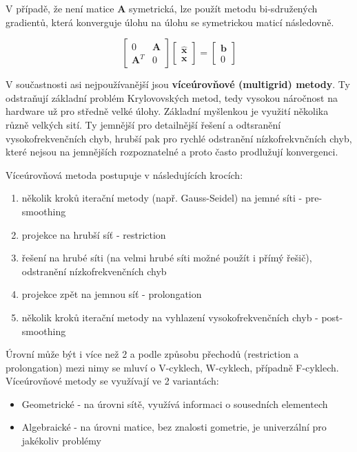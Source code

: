 \documentclass[a4paper,12pt]{report}
\theoremstyle{remark}
\begin{document}
V případě, že není matice $\boldsymbol{A}$ symetrická, lze použít metodu bi-sdružených gradientů, která konverguje úlohu na úlohu se symetrickou maticí následovně.

\begin{equation}
	\begin{bmatrix}
		0 & \boldsymbol{A}\\
		\boldsymbol{A}^T & 0
	\end{bmatrix}
	\begin{bmatrix}
		\hat{\boldsymbol{x}}\\
		\boldsymbol{x}
	\end{bmatrix} =
	\begin{bmatrix}
		\boldsymbol{b}\\
		0
	\end{bmatrix}
\end{equation}


V součastnosti asi nejpoužívanější jsou \textbf{víceúrovňové (multigrid) metody}. Ty odstraňují základní problém Krylovovských metod, tedy vysokou náročnost na hardware už pro středně velké úlohy. Základní myšlenkou je využití několika různě velkých sití. Ty jemnější pro detailnější řešení a odtsranění vysokofrekvenčních chyb, hrubší pak pro rychlé odstranění nízkofrekvnčních chyb, které nejsou na jemnějších rozpoznatelné a proto často prodlužují konvergenci. 

Víceúrovňová metoda postupuje v následujících krocích:
\begin{enumerate}
	\item několik kroků iterační metody (např. Gauss-Seidel) na jemné síti - pre-smoothing
	\item projekce na hrubší síť - restriction
	\item řešení na hrubé síti (na velmi hrubé síti možné použít i přímý řešič), odstranění nízkofrekvenčních chyb
	\item projekce zpět na jemnou síť - prolongation
	\item několik kroků iterační metody na vyhlazení vysokofrekvenčních chyb - post-smoothing
\end{enumerate}

Úrovní může být i více než 2 a podle způsobu přechodů (restriction a prolongation) mezi nimy se mluví o V-cyklech, W-cyklech, případně F-cyklech. Víceúrovňové metody se využívají ve 2 variantách:
\begin{itemize}
	\item Geometrické - na úrovni sítě, využívá informaci o sousedních elementech
	\item Algebraické - na úrovni matice, bez znalosti gometrie, je univerzální pro jakékoliv problémy
\end{itemize}
	
\end{document}
